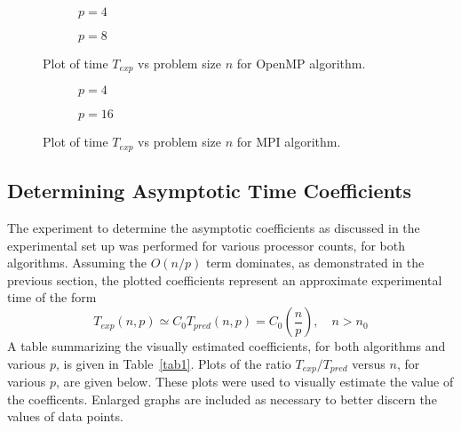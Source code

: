 \documentclass[12pt]{article}
\begin{document}
\begin{algorithm}
{{{{     \begin{figure}[htbp!]
         \begin{subfigure}{0.5\textwidth}
         \centering
           \caption{$p=4$ \label{ompn4}}
     \end{subfigure}
     \begin{subfigure}{0.5\textwidth}
           \centering
           \caption{$p=8$ \label{ompn8}}
       \end{subfigure}
        \caption{Plot of time $T_{exp}$ vs problem size $n$ for OpenMP
           algorithm.\label{ompn}}
     \end{figure}
     \begin{figure}[htbp!]
         \begin{subfigure}{0.5\textwidth}
         \centering
           \caption{$p=4$ \label{mpin4}}
     \end{subfigure}
     \begin{subfigure}{0.5\textwidth}
           \centering
           \caption{$p=16$ \label{mpin16}}
       \end{subfigure}
        \caption{Plot of time $T_{exp}$ vs problem size $n$ for MPI
           algorithm.\label{mpin}}
     \end{figure}


\clearpage
\subsection{Determining Asymptotic Time Coefficients}

The experiment to determine the asymptotic coefficients as discussed in the
experimental set up was performed for various processor counts, for both algorithms.
Assuming the $O(n/p)$ term dominates, as demonstrated in the previous section, the plotted coefficients represent an
approximate experimental time of the form
\begin{equation}
    T_{exp}(n,p) \simeq C_{0}T_{pred}(n,p) = C_{0}\left(\frac{n}{p}\right), \quad n>n_0
    \label{duh}
\end{equation}
A table summarizing the visually estimated coefficients, for both algorithms and various $p$,  is
given in Table~\ref{tab1}. Plots of the ratio $T_{exp}/T_{pred}$ versus $n$, for
various $p$, are given below.  These plots were used to visually estimate the value
of the coefficents.  Enlarged graphs are included as necessary to 
better discern the values of data points.

}}}}
\end{algorithm}
\end{document}
